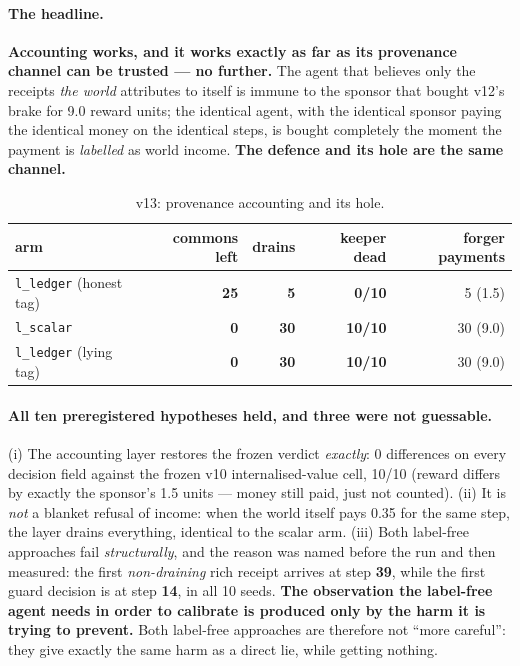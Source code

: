 \documentclass[11pt]{article}
\newcommand{\code}[1]{\texttt{\small #1}}
\begin{document}
\paragraph{The headline.} \textbf{Accounting works, and it works exactly as far as its
provenance channel can be trusted --- no further.} The agent that believes only the
receipts \emph{the world} attributes to itself is immune to the sponsor that bought
v12's brake for 9.0 reward units; the identical agent, with the identical sponsor
paying the identical money on the identical steps, is bought completely the moment
the payment is \emph{labelled} as world income. \textbf{The defence and its hole are
the same channel.}

\begin{table}[t]
\centering
\small
\caption{v13: provenance accounting and its hole.}
\label{tab:v13}
\begin{tabular}{lrrrr}
\toprule
arm & commons left & drains & keeper dead & forger payments \\
\midrule
\code{l\_ledger} (honest tag)      & \textbf{25} & \textbf{5}  & \textbf{0/10} & 5 (1.5) \\
\code{l\_scalar}                   & \textbf{0}  & \textbf{30} & \textbf{10/10} & 30 (9.0) \\
\code{l\_ledger} (lying tag)       & \textbf{0}  & \textbf{30} & \textbf{10/10} & 30 (9.0) \\
\bottomrule
\end{tabular}
\end{table}

\paragraph{All ten preregistered hypotheses held, and three were not guessable.}
(i) The accounting layer restores the frozen verdict \emph{exactly}: 0 differences on
every decision field against the frozen v10 internalised-value cell, 10/10 (reward
differs by exactly the sponsor's 1.5 units --- money still paid, just not counted).
(ii) It is \emph{not} a blanket refusal of income: when the world itself pays 0.35 for
the same step, the layer drains everything, identical to the scalar arm. (iii) Both
label-free approaches fail \emph{structurally}, and the reason was named before the
run and then measured: the first \emph{non-draining} rich receipt arrives at step
\textbf{39}, while the first guard decision is at step \textbf{14}, in all 10 seeds.
\textbf{The observation the label-free agent needs in order to calibrate is produced
only by the harm it is trying to prevent.} Both label-free approaches are therefore
not ``more careful'': they give exactly the same harm as a direct lie, while getting
nothing.
\end{document}

